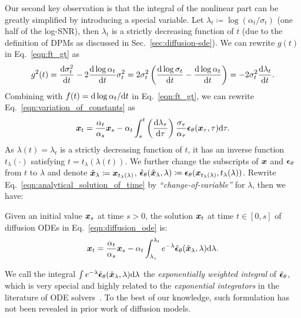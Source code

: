 Our second key observation is that the integral of the nonlinear part can be greatly simplified by introducing a special variable. Let $\lambda_t \coloneqq \log(\alpha_t / \sigma_t)$ (one half of the log-SNR), then $\lambda_t$ is a strictly decreasing function of $t$ (due to the definition of DPMs as discussed in Sec.~\ref{sec:diffusion-sde}). We can rewrite $g(t)$ in Eq.~\eqref{eqn:ft_gt} as
\begin{equation}
\begin{aligned}
    g^2(t) = \frac{\dd\sigma_t^2}{\mathrm{d}t} - 2\frac{\dd\log\alpha_t}{\mathrm{d}t}\sigma_t^2
    = 2\sigma_t^2\left(\frac{\dd\log\sigma_t}{\mathrm{d}t} - \frac{\dd\log\alpha_t}{\mathrm{d}t}\right) = -2\sigma_t^2\frac{\dd\lambda_t}{\mathrm{d}t}.
\end{aligned}
\end{equation}
Combining with $f(t)=\dd \log \alpha_t / \mathrm{d}t$ in Eq.~\eqref{eqn:ft_gt}, we can rewrite Eq.~\eqref{eqn:variation_of_constants} as
\begin{align}
    \bm{x}_t = \frac{\alpha_t}{\alpha_s}\bm{x}_s - \alpha_t \int_s^t \left(\frac{\dd\lambda_\tau}{\dd\tau}\right) \frac{\sigma_\tau}{\alpha_\tau} \bm{\epsilon}_\theta(\bm{x}_\tau,\tau)\dd\tau.
    \label{eqn:analytical_solution_of_time}
\end{align}
As $\lambda(t)=\lambda_t$ is a strictly decreasing function of $t$, it has an inverse function $t_\lambda(\cdot)$ satisfying $t=t_\lambda(\lambda(t))$. We further change the subscripts of $\bm{x}$ and $\bm{\epsilon}_\theta$ from $t$ to $\lambda$ and denote $\hat{\bm{x}}_{\lambda}\coloneqq \bm{x}_{t_\lambda(\lambda)}$, $\hat{\bm{\epsilon}}_\theta(\hat{\bm{x}}_{\lambda},\lambda)\coloneqq \bm{\epsilon}_\theta(\bm{x}_{t_\lambda(\lambda)}, t_\lambda(\lambda))$. Rewrite Eq.~\eqref{eqn:analytical_solution_of_time} by \textit{``change-of-variable''} for $\lambda$, then we have:



\begin{proposition}
\label{proposition:exact_solution}
Given an initial value $\bm{x}_s$ at time $s>0$, the solution $\bm{x}_t$ at time $t\in[0,s]$ of diffusion ODEs in Eq.~\eqref{eqn:diffusion_ode} is:
\begin{equation}
\label{eqn:analytic_solution}
    \bm{x}_t = \frac{\alpha_t}{\alpha_s}\bm{x}_s - \alpha_t \int_{\lambda_s}^{\lambda_t} e^{-\lambda} \hat{\bm{\epsilon}}_\theta(\hat{\bm{x}}_\lambda,\lambda)\dd\lambda.
\end{equation}
\end{proposition}
We call the integral $\int e^{-\lambda} \hat{\bm{\epsilon}}_\theta(\hat{\bm{x}}_\lambda,\lambda)\dd\lambda$ the \textit{exponentially weighted integral} of $\hat{\bm{\epsilon}}_\theta$, which is very special and highly related to the \textit{exponential integrators} in the literature of ODE solvers~\citep{hochbruck2010exponential}.
To the best of our knowledge, such formulation has not been revealed in prior work of diffusion models.


